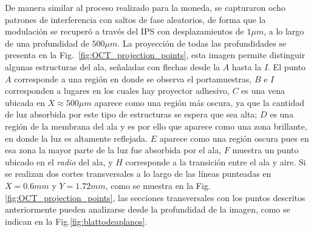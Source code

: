 De manera similar al proceso realizado para la moneda, se capturaron ocho patrones de interferencia con saltos de fase aleatorios, de forma que la modulación se recuperó a través del IPS con desplazamientos de $1\mu m$, a lo largo de una profundidad de $500\mu m$. La proyección \enface de todas las profundidades se presenta en la Fig.~\ref{fig:OCT_projection_points}, esta imagen permite distinguir algunas estructuras del ala, señaladas con flechas desde la $A$ hasta la $I$. El punto $A$ corresponde a una región en donde se observa el portamuestras, $B$ e $I$ corresponden a lugares en los cuales hay proyector adhesivo, $C$ es una vena ubicada en $X\approx 500\mu m$ aparece como una región más oscura, ya que la cantidad de luz absorbida por este tipo de estructuras se espera que sea alta; $D$ es una región de la membrana del ala y es por ello que aparece como una zona brillante, en donde la luz es altamente reflejada. $E$ aparece como una región oscura pues en esa zona la mayor parte de la luz fue absorbida por el ala, $F$ muestra un punto ubicado en el \emph{radio} del ala, y $H$ corresponde a la transición entre el ala y aire. Si se realizan dos cortes transversales a lo largo de las líneas punteadas en $X=0.6mm$ y $Y=1.72mm$, como se muestra en la Fig.\ref{fig:OCT_projection_points}, las secciones transversales con los puntos descritos anteriormente pueden analizarse desde la profundidad de la imagen, como se indican en la Fig.\ref{fig:blattodeaplanos}.
